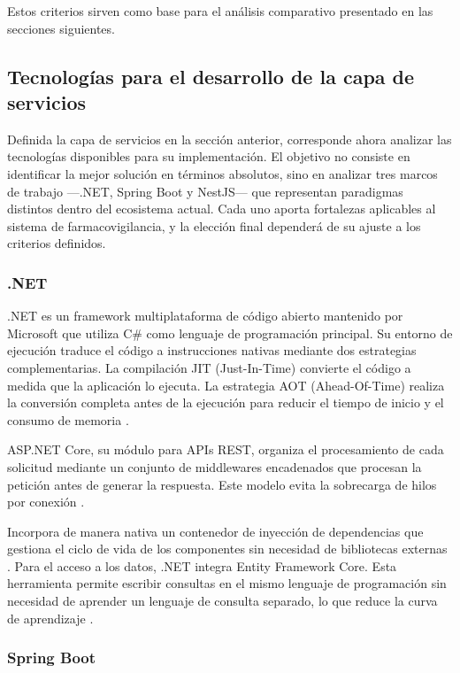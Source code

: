 Estos criterios sirven como base para el análisis comparativo presentado en las secciones siguientes.


\subsection{Tecnologías para el desarrollo de la capa de servicios}
\label{subsection:backend}

Definida la capa de servicios en la sección anterior, corresponde ahora analizar las tecnologías disponibles para su implementación. 
El objetivo no consiste en identificar la mejor solución en términos absolutos, sino en analizar tres marcos de trabajo —.NET, Spring Boot y NestJS— que representan paradigmas distintos dentro del ecosistema actual.
Cada uno aporta fortalezas aplicables al sistema de farmacovigilancia, y la elección final dependerá de su ajuste a los criterios definidos.

\subsubsection{.NET}

.NET es un framework multiplataforma de código abierto mantenido por Microsoft que utiliza C\# como lenguaje de programación principal.
Su entorno de ejecución traduce el código a instrucciones nativas mediante dos estrategias complementarias. 
La compilación JIT (Just-In-Time) convierte el código a medida que la aplicación lo ejecuta. 
La estrategia AOT (Ahead-Of-Time) realiza la conversión completa antes de la ejecución para reducir el tiempo de inicio y el consumo de memoria \cite{dotnet_official}.

ASP.NET Core, su módulo para APIs REST, organiza el procesamiento de cada solicitud mediante un conjunto de middlewares encadenados que procesan la petición antes de generar la respuesta. 
Este modelo evita la sobrecarga de hilos por conexión \cite{ms_aspnet_architecture}.

Incorpora de manera nativa un contenedor de inyección de dependencias que gestiona el ciclo de vida de los componentes sin necesidad de bibliotecas externas \cite{ms_di_doc}. 
Para el acceso a los datos, .NET integra Entity Framework Core. 
Esta herramienta permite escribir consultas en el mismo lenguaje de programación sin necesidad de aprender un lenguaje de consulta separado, lo que reduce la curva de aprendizaje \cite{ef_core_doc}.

\subsubsection{Spring Boot}

